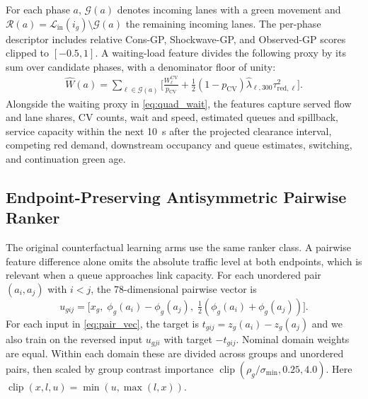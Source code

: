\documentclass[letterpaper,journal]{IEEEtran}
\DeclareMathOperator{\clip}{clip}
\begin{document}
For each phase $a$, $\mathcal{G}(a)$ denotes incoming lanes with a green movement and $\mathcal{R}(a)=\mathcal{L}_{\mathrm{in}}(i_g)\setminus\mathcal{G}(a)$ the remaining incoming lanes. The per-phase descriptor includes relative Cons-GP, Shockwave-GP, and Observed-GP scores clipped to $[-0.5,1]$. A waiting-load feature divides the following proxy by its sum over candidate phases, with a denominator floor of unity:
\begin{equation}
\begin{split}
  \widehat W(a) = \sum_{\ell\in\mathcal G(a)}\Biggl[
    \frac{W_\ell^{\mathrm{CV}}}{p_{\mathrm{CV}}}
    +\frac{1}{2}(1-p_{\mathrm{CV}})\hat\lambda_{\ell,300}\tau_{\mathrm{red},\ell}^2\Biggr].
\end{split}
  \label{eq:quad_wait}
\end{equation}
Alongside the waiting proxy in \eqref{eq:quad_wait}, the features capture served flow and lane shares, CV counts, wait and speed, estimated queues and spillback, service capacity within the next 10~s after the projected clearance interval, competing red demand, downstream occupancy and queue estimates, switching, and continuation green age.

\subsection{Endpoint-Preserving Antisymmetric Pairwise Ranker}
The original counterfactual learning arms use the same ranker class. A pairwise feature difference alone omits the absolute traffic level at both endpoints, which is relevant when a queue approaches link capacity. For each unordered pair $(a_i,a_j)$ with $i<j$, the 78-dimensional pairwise vector is
\begin{equation}
  u_{gij}=\bigl[x_g,\;\phi_g(a_i)-\phi_g(a_j),\;\tfrac{1}{2}(\phi_g(a_i)+\phi_g(a_j))\bigr].
  \label{eq:pair_vec}
\end{equation}
For each input in \eqref{eq:pair_vec}, the target is $t_{gij}=z_g(a_i)-z_g(a_j)$ and we also train on the reversed input $u_{gji}$ with target $-t_{gij}$. Nominal domain weights are equal. Within each domain these are divided across groups and unordered pairs, then scaled by group contrast importance $\clip(\rho_g/\sigma_{\min},0.25,4.0)$. Here $\clip(x,l,u)=\min(u,\max(l,x))$.
\end{document}
